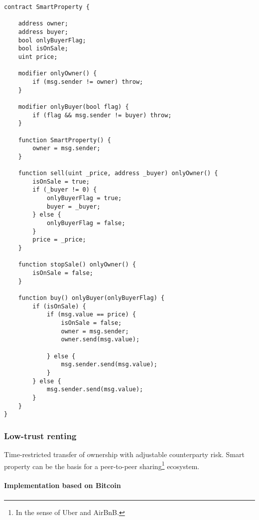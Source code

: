 \newpage
\begin{lstlisting}[breaklines,basicstyle=\tiny]
contract SmartProperty {
    
    address owner;
    address buyer;
    bool onlyBuyerFlag;
    bool isOnSale;
    uint price;
    
    modifier onlyOwner() {
        if (msg.sender != owner) throw;
    }
    
    modifier onlyBuyer(bool flag) {
        if (flag && msg.sender != buyer) throw;
    }
    
    function SmartProperty() {
        owner = msg.sender;
    }
    
    function sell(uint _price, address _buyer) onlyOwner() {
        isOnSale = true;
        if (_buyer != 0) {
            onlyBuyerFlag = true;
            buyer = _buyer;
        } else {
            onlyBuyerFlag = false;
        }
        price = _price;
    }
    
    function stopSale() onlyOwner() {
        isOnSale = false;
    }
        
    function buy() onlyBuyer(onlyBuyerFlag) {
        if (isOnSale) {
            if (msg.value == price) {
                isOnSale = false;
                owner = msg.sender;
                owner.send(msg.value);
                
            } else {
                msg.sender.send(msg.value);
            }
        } else {
            msg.sender.send(msg.value);
        }
    }
}
\end{lstlisting}


\subsubsection{Low-trust renting}

Time-restricted transfer of ownership with adjustable counterparty risk. Smart property can be the basis for a peer-to-peer sharing\footnote{In the sense of Uber and AirBnB.} ecosystem. 

\paragraph{Implementation based on Bitcoin}

